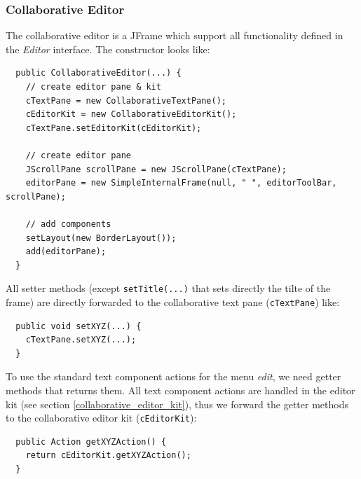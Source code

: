 \subsubsection{Collaborative Editor}
The collaborative editor is a JFrame which support all functionality defined in the \textit{Editor} interface. The constructor looks like:
\begin{verbatim}
  public CollaborativeEditor(...) {
    // create editor pane & kit
    cTextPane = new CollaborativeTextPane();
    cEditorKit = new CollaborativeEditorKit();
    cTextPane.setEditorKit(cEditorKit);

    // create editor pane
    JScrollPane scrollPane = new JScrollPane(cTextPane);
    editorPane = new SimpleInternalFrame(null, " ", editorToolBar, scrollPane);

    // add components		
    setLayout(new BorderLayout());
    add(editorPane);    
  }
\end{verbatim}

All setter methods (except \texttt{setTitle(...)} that sets directly the tilte of the frame) are directly forwarded to the collaborative text pane (\texttt{cTextPane}) like:
\begin{verbatim}
  public void setXYZ(...) {
    cTextPane.setXYZ(...);
  }
\end{verbatim}

To use the standard text component actions for the menu \textit{edit}, we need getter methods that returns them. All text component actions are handled in the editor kit (see section \ref{collaborative_editor_kit}), thus we forward the getter methods to the collaborative editor kit (\texttt{cEditorKit}):
\begin{verbatim}
  public Action getXYZAction() {
    return cEditorKit.getXYZAction();
  }
\end{verbatim}



